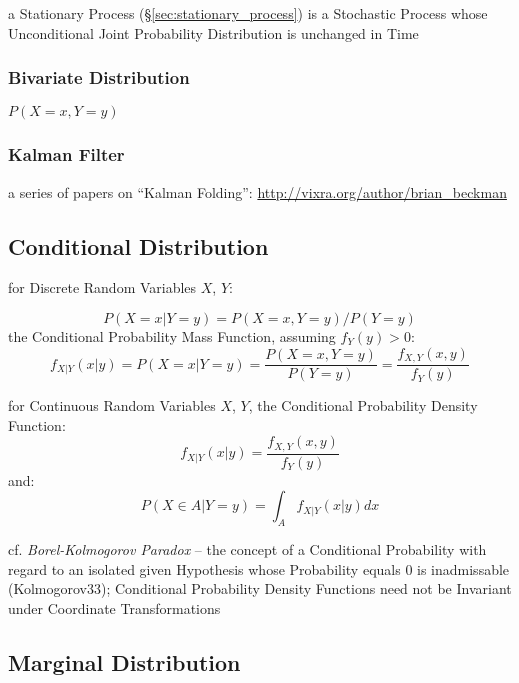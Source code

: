 \fist a Stationary Process (\S\ref{sec:stationary_process}) is a Stochastic
Process whose Unconditional Joint Probability Distribution is unchanged in Time



\subsubsection{Bivariate Distribution}\label{sec:bivariate_distribution}

$P(X = x, Y = y)$



\subsubsection{Kalman Filter}\label{sec:kalman_filter}

a series of papers on ``Kalman Folding'':
\url{http://vixra.org/author/brian_beckman}



\subsection{Conditional Distribution}
\label{sec:conditional_distribution}

for Discrete Random Variables $X$, $Y$:

\[
  P(X = x | Y = y) = P(X = x, Y = y)/P(Y = y)
\]
the Conditional Probability Mass Function, assuming $f_Y(y) > 0$:
\[
  f_{X|Y}(x|y) = P(X = x|Y = y) =
    \frac{P(X = x, Y = y)}{P(Y = y)} =
    \frac{f_{X,Y}(x,y)}{f_Y(y)}
\]

for Continuous Random Variables $X$, $Y$, the Conditional Probability Density
Function:
\[
  f_{X|Y}(x|y) = \frac{f_{X,Y}(x,y)}{f_Y(y)}
\]
and:
\[
  P(X \in A| Y = y) = \int_A f_{X|Y}(x|y) dx
\]

cf. \emph{Borel-Kolmogorov Paradox} -- the concept of a Conditional Probability
with regard to an isolated given Hypothesis whose Probability equals $0$ is
inadmissable (Kolmogorov33); Conditional Probability Density Functions need not
be Invariant under Coordinate Transformations



\subsection{Marginal Distribution}\label{sec:marginal_distribution}


